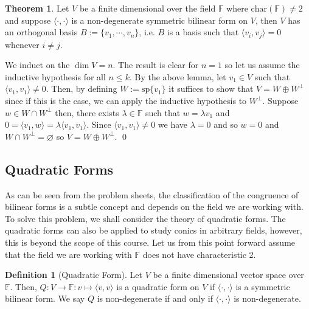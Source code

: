 \documentclass[
]{article}
\theoremstyle{definition}
\newtheorem{theorem}{Theorem}
\theoremstyle{definition}
\newtheorem{definition}{Definition}[section]
\begin{document}
\begin{theorem}\label{diag_symm_bform}
  Let \(V\) be a finite dimensional over the field \(\mathbb{F}\) where 
  \(\text{char}(\mathbb{F}) \neq 2\) and suppose \(\langle \cdot, \cdot \rangle\) 
  is a non-degenerate symmetric bilinear form on \(V\), then \(V\) has an orthogonal 
  basis \(B := \{v_1, \cdots, v_n\}\), i.e. \(B\) is a basis such that 
  \(\langle v_i, v_j \rangle = 0\) whenever \(i \neq j\).
\end{theorem}
\proof

We induct on the \(\dim V = n\). The result is clear for \(n = 1\) so
let us assume the inductive hypothesis for all \(n \le k\). By the above
lemma, let \(v_1 \in V\) such that \(\langle v_1, v_1 \rangle \neq 0\).
Then, by defining \(W := \text{sp}\{v_1\}\) it suffices to show that
\(V = W \oplus W^\bot\) since if this is the case, we can apply the
inductive hypothesis to \(W^\bot\). Suppose \(w \in W \cap W^\bot\)
then, there exists \(\lambda \in \mathbb{F}\) such that
\(w = \lambda v_1\) and
\(0 = \langle v_1, w \rangle =  \lambda \langle v_1, v_1 \rangle\).
Since \(\langle v_1, v_1 \rangle \neq 0\) we have \(\lambda = 0\) and so
\(w = 0\) and \(W \cap W^\bot = \varnothing\) so
\(V = W \oplus W^\bot\). \qed

\hypertarget{quadratic-forms}{%
\subsection{Quadratic Forms}\label{quadratic-forms}}

As can be seen from the problem sheets, the classification of the
congruence of bilinear forms is a subtle concept and depends on the
field we are working with. To solve this problem, we shall consider the
theory of quadratic forms. The quadratic forms can also be applied to
study conics in arbitrary fields, however, this is beyond the scope of
this course. Let us from this point forward assume that the field we are
working with \(\mathbb{F}\) does not have characteristic 2.

\begin{definition}[Quadratic Form]
  Let \(V\) be a finite dimensional vector space over \(\mathbb{F}\). Then, 
  \(Q : V \to \mathbb{F} : v \mapsto \langle v, v \rangle\) is a quadratic form 
  on \(V\) if \(\langle \cdot, \cdot \rangle\) is a symmetric bilinear form. 
  We say \(Q\) is non-degenerate if and only if \(\langle \cdot, \cdot \rangle\) 
  is non-degenerate.
\end{definition}
\end{document}
